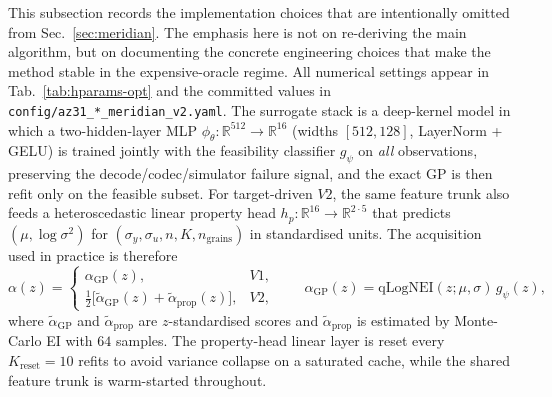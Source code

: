 \documentclass{article}
\newcommand{\R}{\mathbb{R}}
\begin{document}
This subsection records the implementation choices that are intentionally omitted from Sec.~\ref{sec:meridian}. The emphasis here is not on re-deriving the main algorithm, but on documenting the concrete engineering choices that make the method stable in the expensive-oracle regime. All numerical settings appear in Tab.~\ref{tab:hparams-opt} and the committed values in \texttt{config/az31\_*\_meridian\_v2.yaml}. The surrogate stack is a deep-kernel model in which a two-hidden-layer MLP $\phi_\theta : \R^{512} \to \R^{16}$ (widths $[512,128]$, LayerNorm + GELU) is trained jointly with the feasibility classifier $g_\psi$ on \emph{all} observations, preserving the decode/codec/simulator failure signal, and the exact GP is then refit only on the feasible subset. For target-driven $V2$, the same feature trunk also feeds a heteroscedastic linear property head $h_p : \R^{16} \to \R^{2\cdot 5}$ that predicts $(\mu,\log\sigma^2)$ for $(\sigma_y,\sigma_u,n,K,n_{\mathrm{grains}})$ in standardised units. The acquisition used in practice is therefore
\begin{equation}
  \alpha(z) =
  \begin{cases}
    \alpha_{\mathrm{GP}}(z), & V1,\\
    \tfrac{1}{2}\bigl[\tilde\alpha_{\mathrm{GP}}(z) + \tilde\alpha_{\mathrm{prop}}(z)\bigr], & V2,
  \end{cases}
  \qquad
  \alpha_{\mathrm{GP}}(z) = \mathrm{qLogNEI}(z;\mu,\sigma)\, g_\psi(z),
\end{equation}
where $\tilde\alpha_{\mathrm{GP}}$ and $\tilde\alpha_{\mathrm{prop}}$ are $z$-standardised scores and $\tilde\alpha_{\mathrm{prop}}$ is estimated by Monte-Carlo EI with $64$ samples. The property-head linear layer is reset every $K_{\mathrm{reset}}{=}10$ refits to avoid variance collapse on a saturated cache, while the shared feature trunk is warm-started throughout.
\end{document}
